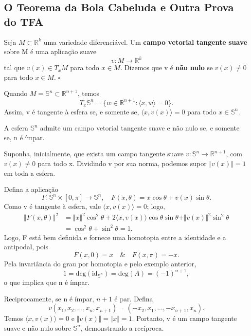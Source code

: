 \documentclass[../differential_topology.tex]{subfiles}
\begin{document}
\subsection{O Teorema da Bola Cabeluda e Outra Prova do TFA}
\begin{def*}
	Seja \(M\subset\mathbb{R}^{k}\) uma variedade diferenciável. Um \textbf{campo vetorial tangente suave} sobre M é uma aplicação suave
	\[
		v:M\rightarrow\mathbb{R}^{k}
	\]
	tal que \(v(x)\in T_xM\) para todo \(x\in M\). Dizemos que v é \textbf{não nulo} se \(v(x)\neq 0\) para todo \(x\in M\). \(\square\)
\end{def*}

\begin{example}
	Quando \(M=\mathbb{S}^{n}\subset\mathbb{R}^{n+1}\), temos
	\[
		T_x\mathbb{S}^{n}=\{w\in\mathbb{R}^{n+1}:\langle x,w\rangle=0\}.
	\]
	Assim, v é tangente à esfera se, e somente se, \(\langle x,v(x)\rangle=0\) para todo \(x\in\mathbb{S}^{n}\).
\end{example}

\hypertarget{hairy_ball}{\begin{theorem*}
		A esfera \(\mathbb{S}^{n}\) admite um campo vetorial tangente suave e não nulo se, e somente se, n é ímpar.
	\end{theorem*}}
\begin{proof*}
	Suponha, inicialmente, que exista um campo tangente suave \(v:\mathbb{S}^{n}\rightarrow\mathbb{R}^{n+1}\), com \(v(x)\neq0\) para todo x. Dividindo v por sua norma, podemos supor \(\Vert v(x)\Vert=1\) em toda a esfera.

	Defina a aplicação
	\[
		F:\mathbb{S}^{n}\times[0,\pi]\rightarrow\mathbb{S}^{n},\quad F(x,\theta)=x\cos\theta+v(x)\sin\theta.
	\]
	Como v é tangente à esfera, vale \(\langle x,v(x)\rangle=0\); logo,
	\begin{align*}
		\Vert F(x,\theta)\Vert^{2}
		 & =\Vert x\Vert^{2}\cos^{2}\theta+2\langle x,v(x)\rangle\cos\theta\sin\theta+\Vert v(x)\Vert^{2}\sin^{2}\theta \\
		 & =\cos^{2}\theta+\sin^{2}\theta=1.
	\end{align*}
	Logo, F está bem definida e fornece uma homotopia entre a identidade e a antipodal, pois
	\[
		F(x,0)=x \quad\&\quad F(x,\pi)=-x.
	\]
	Pela invariância do grau por homotopia e pelo exemplo anterior,
	\[
		1=\mathrm{deg}(\mathrm{id}_{\mathbb{S}^{n}})=\mathrm{deg}(A)=(-1)^{n+1},
	\]
	o que implica que n é ímpar.

	Reciprocamente, se n é ímpar, \(n+1\) é par. Defina
	\[
		v(x_1,x_2,\dotsc,x_n,x_{n+1})=(-x_2,x_1,\dotsc,-x_{n+1},x_n).
	\]
	Temos \(\langle x,v(x)\rangle=0\) e \(\Vert v(x)\Vert=\Vert x\Vert=1\). Portanto, v é um campo tangente suave e não nulo sobre \(\mathbb{S}^{n}\), demonstrando a recíproca. \qedsymbol
\end{proof*}
\end{document}

